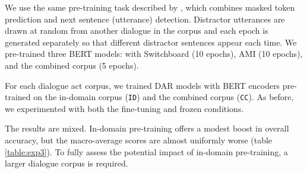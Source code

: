 \documentclass[11pt,a4paper]{article}
\begin{document}
We use the same pre-training task described by \citet{devlinBERTPretrainingDeep2018}, which combines masked token prediction and next sentence (utterance) detection. 
Distractor utterances are drawn at random from another dialogue in the corpus
and each epoch is generated separately so that different distractor sentences appear each time.
We pre-trained three BERT models: with Switchboard (10 epochs), AMI (10 epochs), and the combined corpus (5 epochs).

For each dialogue act corpus, we trained DAR models with BERT encoders pre-trained on the in-domain corpus (\texttt{ID}) and the combined corpus (\texttt{CC}).
As before, we experimented with both the fine-tuning and frozen conditions.

The results are mixed.
In-domain pre-training offers a modest boost in overall accuracy,
but the macro-average scores are almost uniformly worse (table \ref{table:exp3}).
To fully assess the potential impact of in-domain pre-training, a larger dialogue corpus is required.
\end{document}
